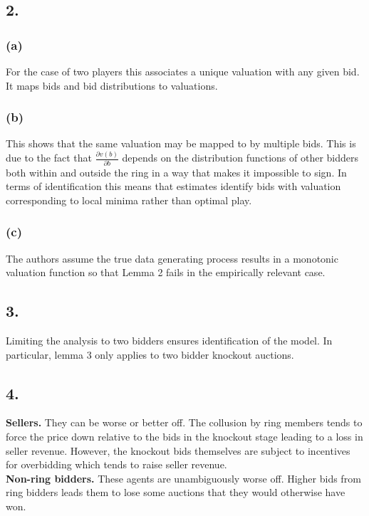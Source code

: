 \documentclass[12pt]{article}
\newcommand{\1}{\mathbbm{1}}
\begin{document}
\subsection*{2.}
\subsubsection*{(a)}
For the case of two players this associates a unique valuation with any given bid. It maps bids and bid distributions to valuations. 

\subsubsection*{(b)}
This shows that the same valuation may be mapped to by multiple bids. This is due to the fact that $\frac{\partial v(b)}{\partial b}$ depends on the distribution functions of other bidders both within and outside the ring in a way that makes it impossible to sign. In terms of identification this means that estimates identify bids with valuation corresponding to local minima rather than optimal play. 

\subsubsection*{(c)}
The authors assume the true data generating process results in a monotonic valuation function so that Lemma 2 fails in the empirically relevant case.   

\subsection*{3.}
Limiting the analysis to two bidders ensures identification of the model. In particular, lemma 3 only applies to two bidder knockout auctions. 

\subsection*{4.}
\textbf{Sellers.} They can be worse or better off. The collusion by ring members tends to force the price down relative to the bids in the knockout stage leading to a loss in seller revenue. However, the knockout bids themselves are subject to incentives for overbidding which tends to raise seller revenue.  \\

\textbf{Non-ring bidders.} These agents are unambiguously worse off. Higher bids from ring bidders leads them to lose some auctions that they would otherwise have won.\\
\end{document}
